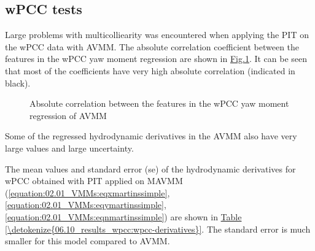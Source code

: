 \documentclass[review]{elsarticle}
\begin{document}
\subsection{wPCC tests}
\label{\detokenize{06.10_results_wpcc:wpcc-tests}}\label{\detokenize{06.10_results_wpcc::doc}}
\sphinxAtStartPar
Large problems with multicolliearity was encountered when applying the PIT on the wPCC data with AVMM. The absolute correlation coefficient between the features in the wPCC yaw moment regression are shown in \hyperref[\detokenize{06.10_results_wpcc:fig-ncorr}]{Fig.\@ \ref{\detokenize{06.10_results_wpcc:fig-ncorr}}}. It can be seen that most of the coefficients have very high absolute correlation (indicated in black).

\begin{figure}[H]
\centering
\capstart

\noindent{}
\caption{Absolute correlation between the features in the wPCC yaw moment regression of AVMM}\label{\detokenize{06.10_results_wpcc:fig-ncorr}}\end{figure}

\sphinxAtStartPar
Some of the regressed hydrodynamic derivatives in the AVMM also have very large values and large uncertainty.

\sphinxAtStartPar
The mean values and standard error (se) of the hydrodynamic derivatives for wPCC obtained with PIT applied on MAVMM (\autoref{equation:02.01_VMMs:eqxmartinssimple},\autoref{equation:02.01_VMMs:eqymartinssimple}, \autoref{equation:02.01_VMMs:eqnmartinssimple}) are shown in \hyperref[\detokenize{06.10_results_wpcc:wpcc-derivatives}]{Table \ref{\detokenize{06.10_results_wpcc:wpcc-derivatives}}}. The standard error is much smaller for this model compared to AVMM.
\end{document}
